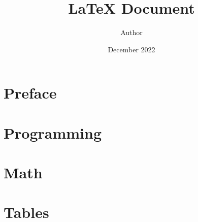 \documentclass[12pt, letterpaper]{memoir}
\begin{document}
%
%
\frontmatter
\title{LaTeX Document}
\author{Author}
\date{December 2022}
\maketitle
%
\clearpage
\tableofcontents
\clearpage
\listoffigures
\clearpage
\listoftables
%
\chapter{Preface}
  \lipsum[2-4]

%
%
\mainmatter

\chapter{Programming}
  

\chapter{Math}
  

%
%
\appendix

\chapter{Tables}
  

%
%
\backmatter

\printbibliography[heading=bibintoc]
\end{document}
